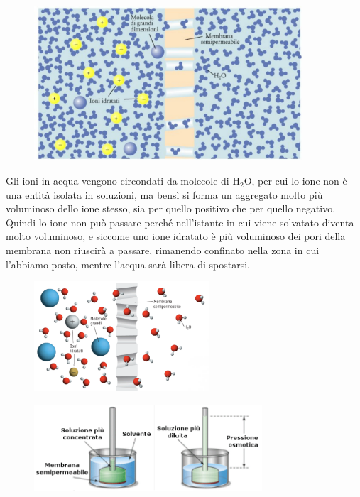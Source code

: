 \begin{figure}[htp]
    \centering
    \includegraphics[width=10cm]{immagini/osmosi.png}
\end{figure}
Gli ioni in acqua vengono circondati da molecole di H$_2$O, per cui lo ione non è una entità isolata in soluzioni, ma bensì si forma un aggregato molto più voluminoso dello ione stesso, sia per quello positivo che per quello negativo. Quindi lo ione non può passare perché nell'istante in cui viene solvatato diventa molto voluminoso, e siccome uno ione idratato è più voluminoso dei pori della membrana non riuscirà a passare, rimanendo confinato nella zona in cui l'abbiamo posto, mentre l'acqua sarà libera di spostarsi.

\hspace{0.5cm}\begin{minipage}{0.5\textwidth}
    \begin{figure}[H]
        \includegraphics[width=6.5cm]{immagini/membrana.png}
    \end{figure}
\end{minipage}
\hspace{-1.3cm}\begin{minipage}{0.5\textwidth}
    \begin{figure}[H]
        \includegraphics[width=8.5cm]{immagini/pressione_osmotica.png}
    \end{figure}
\end{minipage}

